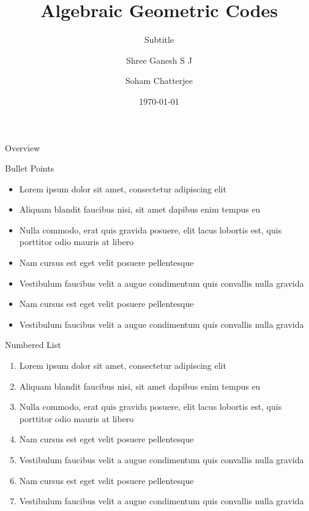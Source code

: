 \documentclass[aspectratio=169,xcolor=dvipsnames, t]{beamer}
\title[Construction of the code]{Algebraic Geometric Codes} %
\subtitle{Subtitle}
\author{Shree Ganesh S J \and Soham Chatterjee}
\institute[CMI]{Chennai Mathematical Institute}
\date{\today} %
\begin{document}
\maketitlepage

\begin{frame}[t]{Overview}
    \tableofcontents
\end{frame}


\begin{frame}{Bullet Points}
    \begin{itemize}
        \item Lorem ipsum dolor sit amet, consectetur adipiscing elit
        \item Aliquam blandit faucibus nisi, sit amet dapibus enim tempus eu
        \item Nulla commodo, erat quis gravida posuere, elit lacus lobortis est, quis porttitor odio mauris at libero
        \item Nam cursus est eget velit posuere pellentesque
        \item Vestibulum faucibus velit a augue condimentum quis convallis nulla gravida
        \item Nam cursus est eget velit posuere pellentesque
        \item Vestibulum faucibus velit a augue condimentum quis convallis nulla gravida
    \end{itemize}
\end{frame}

\begin{frame}{Numbered List}
    \begin{enumerate}
        \item Lorem ipsum dolor sit amet, consectetur adipiscing elit
        \item Aliquam blandit faucibus nisi, sit amet dapibus enim tempus eu
        \item Nulla commodo, erat quis gravida posuere, elit lacus lobortis est, quis porttitor odio mauris at libero
        \item Nam cursus est eget velit posuere pellentesque
        \item Vestibulum faucibus velit a augue condimentum quis convallis nulla gravida
        \item Nam cursus est eget velit posuere pellentesque
        \item Vestibulum faucibus velit a augue condimentum quis convallis nulla gravida
    \end{enumerate}
\end{frame}
\end{document}
